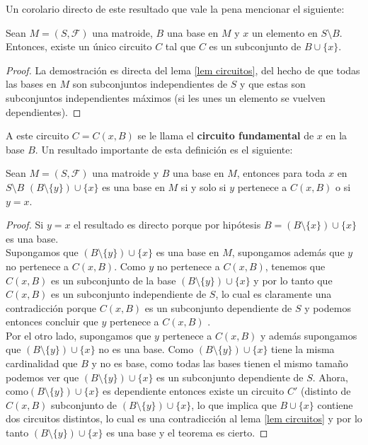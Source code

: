 Un corolario directo de este resultado que vale la pena mencionar el siguiente:

\begin{cor} \label{circuitos bases}
Sean $M=(S,\mathcal{F})$ una matroide, $B$ una base en $M$ y $x$ un elemento en $S \setminus B$. Entonces, existe un único circuito $C$ tal que $C$ es un subconjunto de $B \cup \{x\}$. 
\end{cor}

\begin{proof}
La demostración es directa del lema \ref{lem circuitos}, del hecho de que todas las bases en $M$ son subconjuntos independientes de $S$ y que estas son subconjuntos independientes máximos (si les unes un elemento se vuelven dependientes). 
\end{proof}

A este circuito $C=C(x,B)$ se le llama el \textbf{circuito fundamental} de $x$ en la base $B$. Un resultado importante de esta definición es el siguiente:

\begin{teo}
Sean $M=(S,\mathcal{F})$ una matroide y $B$ una base en $M$, entonces para toda $x$ en $S \setminus B$ $(B \setminus \{ y\}) \cup \{x\}$ es una base en $M$ si y solo si $y$ pertenece a $C(x,B)$ o si $y=x$.
\end{teo}

\begin{proof}
Si $y=x$ el resultado es directo porque por hipótesis $B=$$(B \setminus \{ x\}) \cup \{x\}$ es una base. \\ 
Supongamos que $(B \setminus \{ y\}) \cup \{x\}$ es una base en $M$, supongamos además que $y$ no pertenece a $C(x,B)$. Como $y$ no pertenece a $C(x,B)$, tenemos que $C(x,B)$ es un subconjunto de la base $(B \setminus \{ y\}) \cup \{x\}$ y por lo tanto que $C(x,B)$ es un subconjunto independiente de $S$, lo cual es claramente una contradicción porque $C(x,B)$ es un subconjunto dependiente de $S$ y podemos entonces concluir que $y$ pertenece a $C(x,B)$ . \\
Por el otro lado, supongamos que $y$ pertenece a $C(x,B)$ y además supongamos que $(B \setminus \{ y\}) \cup \{x\}$ no es una base. Como $(B \setminus \{ y\}) \cup \{x\}$ tiene la misma cardinalidad que $B$ y no es base, como todas las bases tienen el mismo tamaño podemos ver que $(B \setminus \{ y\}) \cup \{x\}$ es un subconjunto dependiente de $S$. Ahora, como$(B \setminus \{ y\}) \cup \{x\}$ es dependiente entonces existe un circuito $C'$ (distinto de $C(x,B)$ subconjunto de $(B \setminus \{ y\}) \cup \{x\}$, lo que implica que $B \cup \{x\}$ contiene dos circuitos distintos, lo cual es una contradicción al lema \ref{lem circuitos} y por lo tanto $(B \setminus \{ y\}) \cup \{x\}$ es una base y el teorema es cierto. 
\end{proof}


